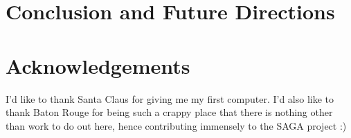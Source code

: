\documentclass[a4paper,10pt]{article}
\begin{document}
\section{Conclusion and Future Directions}

\section{Acknowledgements}
 
I'd like to thank Santa Claus for giving me my first computer. I'd also like 
to thank Baton Rouge for being such a crappy place that there is nothing other
than work to do out here, hence contributing immensely to the SAGA project :) 


  
 
\end{document}
